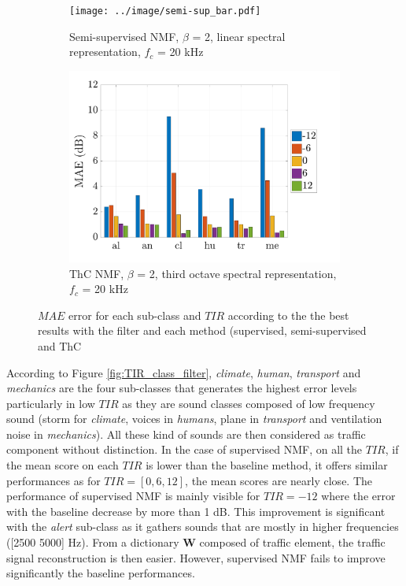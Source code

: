 \documentclass[twocolumn,a4paper,10pt]{article}
\begin{document}
\begin{figure}
    \begin{subfigure}[t]{0.45\textwidth}
        \centering
        \texttt{[image: ../image/semi-sup\_bar.pdf]}
        \caption{Semi-supervised NMF, $\beta$ = 2, linear spectral representation, $f_c$ = 20 kHz}
                \label{fig:TIR_class_semi}
    \end{subfigure}%
    \hfill 
    \begin{subfigure}[t]{0.45\textwidth}
        \centering
        \includegraphics[width=\linewidth]{../image/THC_bar}
        \caption{ThC NMF, $\beta$ = 2, third octave spectral representation, $f_c$ = 20 kHz}
        \label{fig:TIR_class_thc}
    \end{subfigure}
    \caption{$MAE$ error for each sub-class and $TIR$ according to the the best results with the filter and each method (supervised, semi-supervised and ThC}
\end{figure}

According to Figure \ref{fig:TIR_class_filter}, \textit{climate}, \textit{human}, \textit{transport} and \textit{mechanics} are the four sub-classes that generates the highest error levels particularly in low $TIR$ as they are sound classes composed of low frequency sound (storm for \textit{climate}, voices in \textit{humans}, plane in \textit{transport} and ventilation noise in \textit{mechanics}). All these kind of sounds are then considered as traffic component without distinction. 
In the case of supervised NMF, on all the $TIR$, if the mean score on each $TIR$ is lower than the baseline method, it offers similar performances as for $TIR = [0, 6, 12]$, the mean scores are nearly close. The performance of supervised NMF is mainly visible for $TIR = -12$ where the error with the baseline decrease by more than 1 dB. This improvement is significant with the \textit{alert} sub-class as it gathers sounds that are mostly in higher frequencies ([2500 5000] Hz). From a dictionary $\mathbf{W}$ composed of traffic element, the traffic signal reconstruction is then easier. However, supervised NMF fails to improve significantly the baseline performances.
\end{document}
